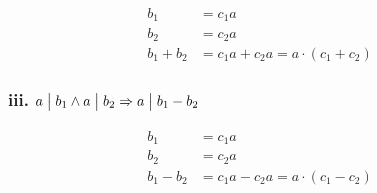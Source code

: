 \documentclass[11pt,a4paper]{article}
\begin{document}
\begin{align*}
b_1 &= c_1a\\
b_2 &= c_2a\\
b_1 + b_2 &= c_1a + c_2a = a \cdot (c_1 + c_2) \tag*{\checkmark}
\end{align*}

\subsubsection*{iii. $a \bigm| b_1 \wedge a \bigm| b_2 \Rightarrow a \bigm| b_1 - b_2$}

\begin{align*}
b_1 &= c_1a\\
b_2 &= c_2a\\
b_1 - b_2 &= c_1a - c_2a = a \cdot (c_1 - c_2) \tag*{\checkmark}
\end{align*}
\end{document}

